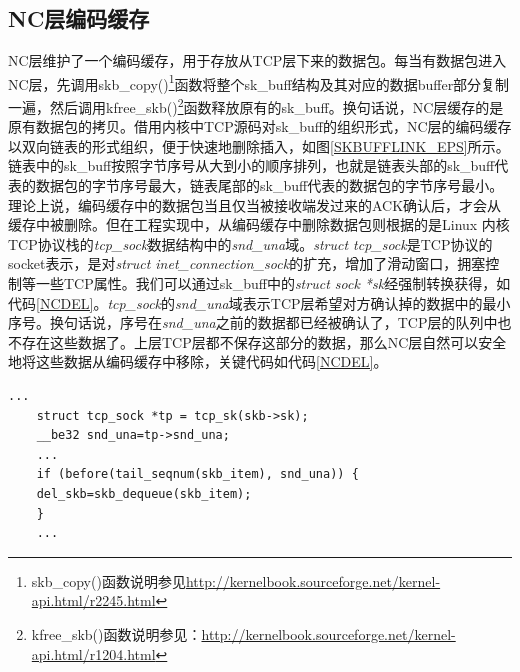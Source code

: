 \subsection{NC层编码缓存}%
NC层维护了一个编码缓存，用于存放从TCP层下来的数据包。每当有数据包进入NC层，先调用skb\_copy()\footnote{skb\_copy()函数说明参见\url{http://kernelbook.sourceforge.net/kernel-api.html/r2245.html}}函数将整个sk\_buff结构及其对应的数据buffer部分复制一遍，然后调用kfree\_skb()\footnote{kfree\_skb()函数说明参见：\url{http://kernelbook.sourceforge.net/kernel-api.html/r1204.html}}函数释放原有的sk\_buff。换句话说，NC层缓存的是原有数据包的拷贝。借用内核中TCP源码对sk\_buff的组织形式，NC层的编码缓存以双向链表的形式组织，便于快速地删除插入，如图\ref{SKBUFFLINK_EPS}所示。链表中的sk\_buff按照字节序号从大到小的顺序排列，也就是链表头部的sk\_buff代表的数据包的字节序号最大，链表尾部的sk\_buff代表的数据包的字节序号最小。理论上说，编码缓存中的数据包当且仅当被接收端发过来的ACK确认后，才会从缓存中被删除。但在工程实现中，从编码缓存中删除数据包则根据的是Linux 内核TCP协议栈的\emph{tcp\_sock}数据结构中的\emph{snd\_una}域。\emph{struct tcp\_sock}是TCP协议的socket表示，是对\emph{struct inet\_connection\_sock}的扩充，增加了滑动窗口，拥塞控制等一些TCP属性。我们可以通过sk\_buff中的\emph{struct sock *sk}经强制转换获得，如代码\ref{NCDEL}。\emph{tcp\_sock}的\emph{snd\_una}域表示TCP层希望对方确认掉的数据中的最小序号。换句话说，序号在\emph{snd\_una}之前的数据都已经被确认了，TCP层的队列中也不存在这些数据了。上层TCP层都不保存这部分的数据，那么NC层自然可以安全地将这些数据从编码缓存中移除，关键代码如代码\ref{NCDEL}。

	\begin{lstlisting}[float,caption=NC层编码缓存删包关键部分,label={NCDEL},language={[ANSI]C}]
	...
	struct tcp_sock *tp = tcp_sk(skb->sk);
	__be32 snd_una=tp->snd_una;
	...
	if (before(tail_seqnum(skb_item), snd_una)) {
	del_skb=skb_dequeue(skb_item);
	}
	...
	\end{lstlisting}

